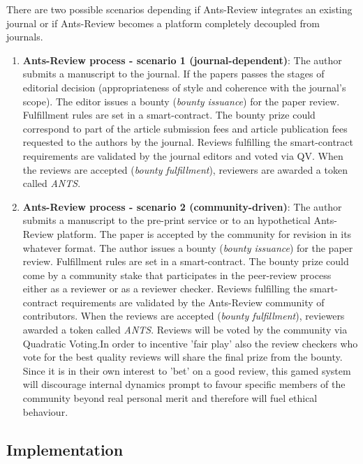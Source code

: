 \documentclass[runningheads]{llncs}
\begin{document}
There are two possible scenarios depending if Ants-Review integrates an existing journal or if Ants-Review becomes a platform completely decoupled from journals.

\begin{enumerate}
    \item \textbf{Ants-Review process - scenario 1 (journal-dependent)}: The author submits a manuscript to the journal. If the papers passes the stages of editorial decision (appropriateness of style and coherence with the journal's scope). The editor issues a bounty (\emph{bounty issuance}) for the paper review. Fulfillment rules are set in a smart-contract. The bounty prize could correspond to part of the article submission fees and article publication fees requested to the authors by the journal. Reviews fulfilling the smart-contract requirements are validated by the journal editors and voted via QV. When the reviews are accepted (\emph{bounty fulfillment}), reviewers are awarded a token called \emph{ANTS}.
    \item \textbf{Ants-Review process - scenario 2 (community-driven)}: The author submits a manuscript to the pre-print service or to an hypothetical Ants-Review platform. The paper is accepted by the community for revision in its whatever format. The author issues a bounty (\emph{bounty issuance}) for the paper review. Fulfillment rules are set in a smart-contract. The bounty prize could come by a community stake that participates in the peer-review process either as a reviewer or as a reviewer checker. Reviews fulfilling the smart-contract requirements are validated by the Ants-Review community of contributors. When the reviews are accepted (\emph{bounty fulfillment}), reviewers awarded a token called \emph{ANTS}. Reviews will be voted by the community via Quadratic Voting.In order to incentive 'fair play' also the review checkers who vote for the best quality reviews will share the final prize from the bounty. Since it is in their own interest to 'bet' on a good review, this gamed system will discourage internal dynamics prompt to favour specific members of the community beyond real personal merit and therefore will fuel ethical behaviour.

\end{enumerate}

\subsection{Implementation}
\end{document}
